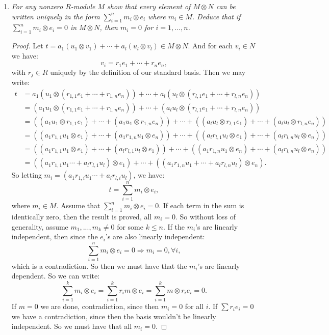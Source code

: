 \documentclass[12pt]{amsbook}
\theoremstyle{plain}
\numberwithin{section}{chapter}
\numberwithin{equation}{chapter}
\theoremstyle{definition}
\theoremstyle{remark}
\newcommand{\bee}{\begin{equation}\begin{aligned}}
\newcommand{\eee}{\end{aligned}\end{equation}}
\newcommand{\tens}{\otimes}
\renewcommand{\leq}{\leqslant}
\begin{document}
\begin{enumerate}[label=\arabic*.]
\begin{enumerate}
\item \textit{For any nonzero $R$-module $M$ show that every element of $M \tens N$ can be written uniquely in the form $\sum_{i = 1}^n m_i \tens e_i$ where $m_i \in M$. Deduce that if $\sum_{i  =1}^n m_i \tens e_i = 0$ in $M \tens N$, then $m_i = 0$ for $i  = 1,...,n$. }

\begin{proof}
Let $t = a_1(u_1 \otimes v_1) + \cdots + a_l(u_l \otimes v_l) \in M \tens N$. And for each $v_i \in N$ we have: 
$$
v_i = r_1e_1 + \cdots + r_ne_n,
$$
with $r_j \in R$ uniquely by the definition of our standard basis. Then we may write: 
\bee
t &= a_1(u_1 \tens (r_{1,1}e_1 + \cdots + r_{1,n}e_n)) + \cdots + a_l(u_l \tens (r_{l,1}e_1 + \cdots + r_{l,n}e_n))\\
&= (a_1u_1 \tens (r_{1,1}e_1 + \cdots + r_{1,n}e_n)) + \cdots + (a_lu_l \tens (r_{l,1}e_1 + \cdots + r_{l,n}e_n))\\
&= ((a_1u_1 \tens r_{1,1}e_1) + \cdots + (a_1u_1 \tens r_{1,n}e_n)) + \cdots + ((a_lu_l \tens r_{l,1}e_1) + \cdots + (a_lu_l \tens r_{l,n}e_n))\\
&= ((a_1r_{1,1}u_1 \tens e_1) + \cdots + (a_1r_{1,n}u_1 \tens e_n)) + \cdots + ((a_lr_{l,1}u_l \tens e_1) + \cdots + (a_lr_{l,n}u_l \tens e_n))\\
&= ((a_1r_{1,1}u_1 \tens e_1) + \cdots + (a_lr_{l,1}u_l \tens e_1) ) + \cdots + ((a_1r_{1,n}u_1 \tens e_n) + \cdots + (a_lr_{l,n}u_l \tens e_n))\\
&= ((a_1r_{1,1}u_1 \cdots + a_lr_{l,1}u_l) \tens e_1)  + \cdots + ((a_1r_{1,n}u_1  + \cdots + a_lr_{l,n}u_l) \tens e_n).
\eee
So letting $m_i = (a_1r_{1,i}u_1 \cdots + a_lr_{l,i}u_l)$, we have:
$$
t = \sum_{i = 1}^n m_i \tens e_i,
$$
where $m_i \in M$. Assume that $\sum_{i = 1}^n m_i \tens e_i = 0$. If each term in the sum is identically zero, then the result is proved, all $m_i = 0$. So without loss of generality, assume $m_1,...,m_k \neq 0$ for some $k \leq n$. If the $m_i$'s are linearly independent, then since the $e_i$'s are also linearly independent:
$$
\sum_{i = 1}^n m_i \tens e_i = 0 \Rightarrow m_i = 0, \forall i,
$$ which is a contradiction. So then we must have that the $m_i$'s are linearly dependent. So we can write: 
$$
\sum_{i  =1}^k m_i \tens e_i = \sum_{i  =1}^k r_i  m \tens e_i = \sum_{i  =1}^k   m \tens r_ie_i = 0.
$$
If $m = 0$ we are done, contradiction, since then $m_i = 0$ for all $i$. If $\sum r_ie_i = 0$ we have a contradiction, since then the basis wouldn't be linearly independent. So we must have that all $m_i = 0$. 
\end{proof}


\end{enumerate}
\end{enumerate}
\end{document}
